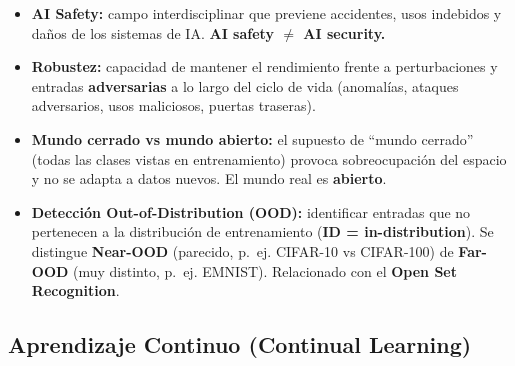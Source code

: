 \documentclass[12pt]{book} %
\providecommand{\tightlist}{%
  \setlength{\itemsep}{0pt}\setlength{\parskip}{0pt}}
\begin{document}
\begin{itemize}
\tightlist
\item
  \textbf{AI Safety:} campo interdisciplinar que previene accidentes,
  usos indebidos y daños de los sistemas de IA. \textbf{AI safety
  \(\neq\) AI security.}
\item
  \textbf{Robustez:} capacidad de mantener el rendimiento frente a
  perturbaciones y entradas \textbf{adversarias} a lo largo del ciclo de
  vida (anomalías, ataques adversarios, usos maliciosos, puertas
  traseras).
\item
  \textbf{Mundo cerrado vs mundo abierto:} el supuesto de ``mundo
  cerrado'' (todas las clases vistas en entrenamiento) provoca
  sobreocupación del espacio y no se adapta a datos nuevos. El mundo
  real es \textbf{abierto}.
\item
  \textbf{Detección Out-of-Distribution (OOD):} identificar entradas que
  no pertenecen a la distribución de entrenamiento (\textbf{ID =
  in-distribution}). Se distingue \textbf{Near-OOD} (parecido, p.~ej.
  CIFAR-10 vs CIFAR-100) de \textbf{Far-OOD} (muy distinto, p.~ej.
  EMNIST). Relacionado con el \textbf{Open Set Recognition}.
\end{itemize}

\hypertarget{aprendizaje-continuo-continual-learning}{%
\subsection{Aprendizaje Continuo (Continual
Learning)}\label{aprendizaje-continuo-continual-learning}}
\end{document}
